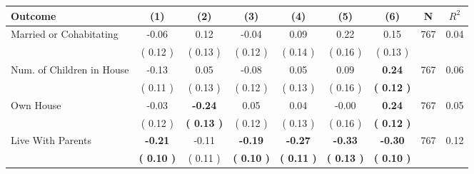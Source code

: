\begin{tabular}{lcccccccc}
\toprule
 \textbf{Outcome} & \textbf{(1)} & \textbf{(2)} & \textbf{(3)} & \textbf{(4)} & \textbf{(5)} & \textbf{(6)} & \textbf{N} & \textbf{$ R^2$} \\
\midrule
Married or Cohabitating &     -0.06 &      0.12 &     -0.04 &      0.09 &      0.22 &      0.15 & 767 &       0.04 \\ 
 & (     0.12 ) & (     0.13 ) & (     0.12 ) & (     0.14 ) & (     0.16 ) & (     0.13 ) & \\
Num. of Children in House &     -0.13 &      0.05 &     -0.08 &      0.05 &      0.09 & \textbf{     0.24} & 767 &       0.06 \\ 
 & (     0.11 ) & (     0.13 ) & (     0.12 ) & (     0.13 ) & (     0.16 ) & \textbf{(     0.12 )} & \\
Own House &     -0.03 & \textbf{    -0.24} &      0.05 &      0.04 &     -0.00 & \textbf{     0.24} & 767 &       0.05 \\ 
 & (     0.12 ) & \textbf{(     0.13 )} & (     0.12 ) & (     0.13 ) & (     0.16 ) & \textbf{(     0.12 )} & \\
Live With Parents & \textbf{    -0.21} &     -0.11 & \textbf{    -0.19} & \textbf{    -0.27} & \textbf{    -0.33} & \textbf{    -0.30} & 767 &       0.12 \\ 
 & \textbf{(     0.10 )} & (     0.11 ) & \textbf{(     0.10 )} & \textbf{(     0.11 )} & \textbf{(     0.13 )} & \textbf{(     0.10 )} & \\
\bottomrule
\end{tabular}
